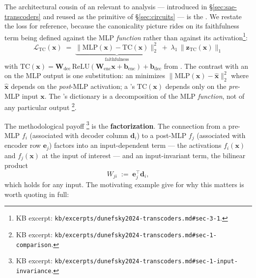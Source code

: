 The architectural cousin of an  relevant to  analysis ---
introduced in \S\ref{sec:sae-transcoders} and reused as the primitive
of \S\ref{sec:circuits} --- is the \emph{}
\citep{dunefsky2024-transcoders}. We restate the loss for reference,
because the canonicality picture rides on its faithfulness term being
defined against the MLP \emph{function} rather than against its
activation\footnote{KB excerpt:
\nolinkurl{kb/excerpts/dunefsky2024-transcoders.md#sec-3-1}.}:
\begin{equation}
  \mathcal{L}_{\text{TC}}(\mathbf{x})
  \;=\;
  \underbrace{\|\mathrm{MLP}(\mathbf{x}) - \mathrm{TC}(\mathbf{x})\|_2^2}_{\text{faithfulness}}
  \;+\;
  \lambda_1\,\|\mathbf{z}_{\text{TC}}(\mathbf{x})\|_1
  \label{eq:transcoder-loss-canonical}
\end{equation}
with $\mathrm{TC}(\mathbf{x}) = \mathbf{W}_\text{dec}\,\mathrm{ReLU}(\mathbf{W}_\text{enc}\mathbf{x} + \mathbf{b}_\text{enc}) + \mathbf{b}_\text{dec}$
from \citet[\S 3.1, Eq.~3--5]{dunefsky2024-transcoders}. The
contrast with an  on the MLP output is one substitution: an 
minimizes $\|\mathrm{MLP}(\mathbf{x}) - \hat{\mathbf{x}}\|_2^2$ where
$\hat{\mathbf{x}}$ depends on the \emph{post}-MLP activation; a
's $\mathrm{TC}(\mathbf{x})$ depends only on the
\emph{pre}-MLP input $\mathbf{x}$. The 's  dictionary
is a decomposition of the MLP \emph{function}, not of any particular
output \citep[\S 1]{dunefsky2024-transcoders}\footnote{KB excerpt:
\nolinkurl{kb/excerpts/dunefsky2024-transcoders.md#sec-1-comparison}.}.

The methodological payoff
\citep[\S 1]{dunefsky2024-transcoders}\footnote{KB excerpt:
\nolinkurl{kb/excerpts/dunefsky2024-transcoders.md#sec-1-input-invariance}.}
is the \textbf{ factorization}. The connection from a
pre-MLP  $f_i$ (associated with decoder column $\mathbf{d}_i$)
to a post-MLP   $f_j$ (associated with encoder row
$\mathbf{e}_j$) factors into an input-dependent term --- the
activations $f_i(\mathbf{x})$ and $f_j(\mathbf{x})$ at the input of
interest --- and an input-invariant term, the bilinear product
\begin{equation}
  W_{j i} \;:=\; \mathbf{e}_j^\top \mathbf{d}_i,
  \label{eq:transcoder-bilinear}
\end{equation}
which holds for any input. The motivating example
\citet[\S 1]{dunefsky2024-transcoders} give for why this matters is
worth quoting in full:

